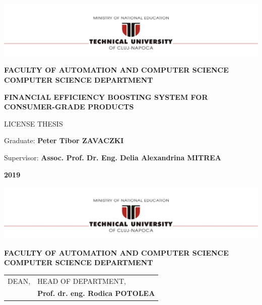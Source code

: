 \documentclass[12pt,a4paper,twoside]{report}
\renewcommand{\thesisauthor}{Peter Tibor ZAVACZKI}    %
\renewcommand{\thesisyear}{2019}      %
\renewcommand{\thesistitle}{FINANCIAL EFFICIENCY BOOSTING SYSTEM FOR CONSUMER-GRADE PRODUCTS}
\renewcommand{\thesissupervisor}{Assoc. Prof. Dr. Eng. Delia Alexandrina MITREA}
\newcommand{\department}{\bf FACULTY OF AUTOMATION AND COMPUTER SCIENCE\\
COMPUTER SCIENCE DEPARTMENT}
\newcommand{\thesis}{LICENSE THESIS}
\newcommand{\utcnlogo}{\includegraphics[width=15cm]{img/tucn.jpg}}
\begin{document}

\newenvironment{definition}[1][Defini\c{t}ie.]{\begin{trivlist}
    \item[\hskip \labelsep {\bfseries #1}]}{\end{trivlist}}




\setcounter{secnumdepth}{3}


\begin{center}
  \utcnlogo

  \department

  \vspace{4cm}

  {\bf \thesistitle} %

  \vspace{1.5cm}

  \thesis

  \vspace{5.75cm}

  Graduate: {\bf \thesisauthor}

  Supervisor: {\bf \thesissupervisor}

  \vspace{3cm}
  {\bf \thesisyear}
\end{center}

\thispagestyle{empty}
\newpage

\begin{center}
  \utcnlogo

  \department

\end{center}
\vspace{0.5cm}

\begin{tabular}{p{7cm}p{8cm}}
  \hspace{-1cm}DEAN,                             & HEAD OF DEPARTMENT,                 \\
  \hspace{-1cm}{\bf Prof. dr. eng. Liviu MICLEA} & {\bf Prof. dr. eng. Rodica POTOLEA} \\
\end{tabular}
\end{document}
